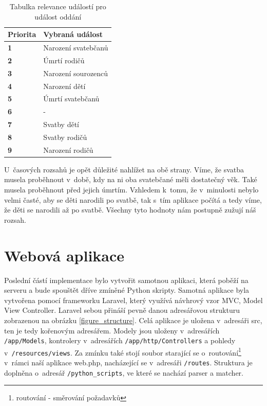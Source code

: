 \begin{table}[!ht]
	\centering
	\begin{tabular}{ll}
		\hline
		\textbf{Priorita} & \textbf{Vybraná událost} \\ \hline
		\rowcolor{tableGreen}
		\textbf{1} & Narození svatebčanů \\ 
		\rowcolor{tableGreen}
		\textbf{2} & Úmrtí rodičů \\ 
		\rowcolor{tableGreen}
		\textbf{3} & Narození sourozenců \\ 
		\rowcolor{tableOrange}
		\textbf{4} & Narození dětí \\ 
		\rowcolor{tableOrange}
		\textbf{5} & Úmrtí svatebčanů \\ 
		\rowcolor{tableOrange}
		\textbf{6} & - \\ 
		\rowcolor{tableRed}
		\textbf{7} & Svatby dětí \\ 
		\rowcolor{tableRed}
		\textbf{8} & Svatby rodičů \\ 
		\rowcolor{tableRed}
		\textbf{9} & Narození rodičů \\ \hline
	\end{tabular}
	\caption{Tabulka relevance událostí pro událost oddání}
\end{table}

U~časových rozsahů je opět důležité nahlížet na obě strany. Víme, že svatba musela proběhnout v~době, kdy na ni oba svatebčané měli dostatečný věk. Také musela proběhnout před jejich úmrtím. Vzhledem k~tomu, že v~minulosti nebylo velmi časté, aby se děti narodili po svatbě, tak s~tím aplikace počítá a tedy víme, že děti se narodili až po svatbě. Všechny tyto hodnoty nám postupně zužují náš rozsah.



\section{Webová aplikace}
Poslední částí implementace bylo vytvořit samotnou aplikaci, která poběží na serveru a bude spouštět dříve zmíněné Python skripty. Samotná aplikace byla vytvořena pomocí frameworku Laravel, který využívá návhrový vzor MVC, Model View Controller. Laravel sebou přináší pevně danou adresářovou strukturu zobrazenou na obrázku \ref{figure_structure}. Celá aplikace je uložena v~adresáři src, ten je tedy kořenovým adresářem. Modely jsou uloženy v~adresářích \verb|/app/Models|, kontrolery v~adresářích \verb|/app/http/Controllers| a pohledy v~\verb|/resources/views|. Za zmínku také stojí soubor starající se o~routování\footnote{routování - směrování požadavků} v~rámci naší aplikace web.php, nacházející se v~adresáři \verb|/routes|. Struktura je doplněna o~adresář \verb|/python_scripts|, ve které se nachází parser a matcher.

